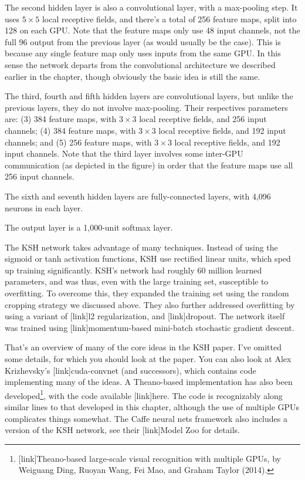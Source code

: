 \documentclass[a4paper,twoside,10pt]{book}
\begin{document}
The second hidden layer is also a convolutional layer, with a max-pooling step. It uses $5\times5$ local receptive fields, and there's a total of 256 feature maps, split into 128 on each GPU. Note that the feature maps only use 48 input channels, not the full 96 output from the previous layer (as would usually be the case). This is because any single feature map only uses inputs from the same GPU. In this sense the network departs from the convolutional architecture we described earlier in the chapter, though obviously the basic idea is still the same.

The third, fourth and fifth hidden layers are convolutional layers, but unlike the previous layers, they do not involve max-pooling. Their respectives parameters are: (3) 384 feature maps, with $3\times3$ local receptive fields, and 256 input channels; (4) 384 feature maps, with $3\times3$ local receptive fields, and 192 input channels; and (5) 256 feature maps, with $3\times3$ local receptive fields, and 192 input channels. Note that the third layer involves some inter-GPU communication (as depicted in the figure) in order that the feature maps use all 256 input channels.

The sixth and seventh hidden layers are fully-connected layers, with 4,096 neurons in each layer.

The output layer is a 1,000-unit softmax layer.

The KSH network takes advantage of many techniques. Instead of using the sigmoid or tanh activation functions, KSH use rectified linear units, which sped up training significantly. KSH's network had roughly 60 million learned parameters, and was thus, even with the large training set, susceptible to overfitting. To overcome this, they expanded the training set using the random cropping strategy we discussed above. They also further addressed overfitting by using a variant of [link]l2 regularization, and [link]dropout. The network itself was trained using [link]momentum-based mini-batch stochastic gradient descent.

That's an overview of many of the core ideas in the KSH paper. I've omitted some details, for which you should look at the paper. You can also look at Alex Krizhevsky's [link]cuda-convnet (and successors), which contains code implementing many of the ideas. A Theano-based implementation has also been developed\footnote{[link]Theano-based large-scale visual recognition with multiple GPUs, by Weiguang Ding, Ruoyan Wang, Fei Mao, and Graham Taylor (2014).}, with the code available [link]here. The code is recognizably along similar lines to that developed in this chapter, although the use of multiple GPUs complicates things somewhat. The Caffe neural nets framework also includes a version of the KSH network, see their [link]Model Zoo for details.
\end{document}
